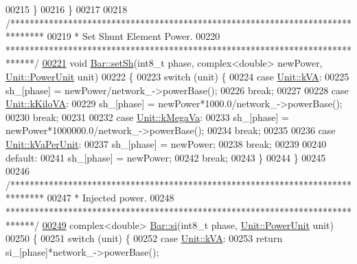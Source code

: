 \begin{DoxyCode}
00215   \}
00216 \}
00217 
00218 \textcolor{comment}{/*******************************************************************************}
00219 \textcolor{comment}{ * Set Shunt Element Power.}
00220 \textcolor{comment}{ ******************************************************************************/}
\hypertarget{bar_8cpp_source_l00221}{}\hyperlink{group___models_gafd91c7f15566b9d5a68a197efeaeaf26}{00221} \textcolor{keywordtype}{void} \hyperlink{group___models_gafd91c7f15566b9d5a68a197efeaeaf26}{Bar::setSh}(int8\_t phase, complex<double> newPower, 
      \hyperlink{class_unit_ace265ae255370ccacfd5370337572c3b}{Unit::PowerUnit} unit)
00222 \{
00223   \textcolor{keywordflow}{switch} (unit) \{
00224   \textcolor{keywordflow}{case} \hyperlink{class_unit_ace265ae255370ccacfd5370337572c3ba72b181a842ae2759488a2fa1410d3696}{Unit::kVA}:
00225     sh\_[phase] = newPower/network\_->powerBase();
00226     \textcolor{keywordflow}{break};
00227 
00228   \textcolor{keywordflow}{case} \hyperlink{class_unit_ace265ae255370ccacfd5370337572c3bac9e5154522fbb810d7aed75c3ff47cb2}{Unit::kKiloVA}:
00229     sh\_[phase] = newPower*1000.0/network\_->powerBase();
00230     \textcolor{keywordflow}{break};
00231 
00232   \textcolor{keywordflow}{case} \hyperlink{class_unit_ace265ae255370ccacfd5370337572c3ba6039da0ed20f8bee64305bab8bdec365}{Unit::kMegaVa}:
00233     sh\_[phase] = newPower*1000000.0/network\_->powerBase();
00234     \textcolor{keywordflow}{break};
00235 
00236   \textcolor{keywordflow}{case} \hyperlink{class_unit_ace265ae255370ccacfd5370337572c3bae056e80d620a87c61a44c359e6b05cc1}{Unit::kVaPerUnit}:
00237     sh\_[phase] = newPower;
00238     \textcolor{keywordflow}{break};
00239 
00240   \textcolor{keywordflow}{default}:
00241     sh\_[phase] = newPower;
00242     \textcolor{keywordflow}{break};
00243   \}
00244 \}
00245 
00246 \textcolor{comment}{/*******************************************************************************}
00247 \textcolor{comment}{ * Injected power.}
00248 \textcolor{comment}{ ******************************************************************************/}
\hypertarget{bar_8cpp_source_l00249}{}\hyperlink{group___models_ga9af07eb85c2c76eb3bc73e25bb842c1e}{00249} complex<double> \hyperlink{group___models_ga9af07eb85c2c76eb3bc73e25bb842c1e}{Bar::si}(int8\_t phase, \hyperlink{class_unit_ace265ae255370ccacfd5370337572c3b}{Unit::PowerUnit} unit)
00250 \{
00251   \textcolor{keywordflow}{switch} (unit) \{
00252   \textcolor{keywordflow}{case} \hyperlink{class_unit_ace265ae255370ccacfd5370337572c3ba72b181a842ae2759488a2fa1410d3696}{Unit::kVA}:
00253     \textcolor{keywordflow}{return} si\_[phase]*network\_->powerBase();

\end{DoxyCode}
